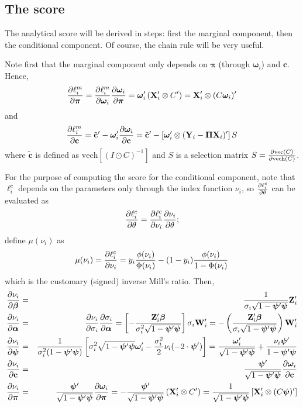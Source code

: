\documentclass[a4paper,10pt]{article}
\newcommand{\pder}[2]{\ensuremath\frac{\partial #1}{\partial #2}}
\newcommand{\Depvar}{y_{i}}
\newcommand{\Endog}{\mathbf{Y}_{i}}
\newcommand{\Expla}{\mathbf{Z}_{i}}
\newcommand{\ExoInst}{\mathbf{X}_{i}}
\newcommand{\CSReg}{\mathbf{W}_{i}}
\newcommand{\ScRfDist}{\bm{\omega}_i}
\newcommand{\ProbitPar}{\bm{\beta}}
\newcommand{\RfPar}{\bm{\Pi}}
\newcommand{\vRfPar}{\bm{\pi}}
\newcommand{\VarPar}{\bm{\alpha}}
\newcommand{\CondSig}{\sigma_i}
\newcommand{\ScCov}{\bm{\psi}}
\newcommand{\vechC}{\mathbf{c}}
\begin{document}
\subsection{The score}
\label{sec:score}

The analytical score will be derived in steps: first the marginal
component, then the conditional component. Of course, the chain rule will
be very useful.

Note first that the marginal component only depends on $\vRfPar$
(through $\ScRfDist$) and $\vechC$. Hence,
\[
\pder{\ell^m_i}{\vRfPar} = \pder{\ell^m_i}{\ScRfDist}
\pder{\ScRfDist}{\vRfPar} = \ScRfDist' \left( \ExoInst' \otimes C'
\right) =  \ExoInst' \otimes (C \ScRfDist)'
\]
and
\[
\pder{\ell^m_i}{\vechC} = \tilde{\mathbf{c}}' -
\ScRfDist'\pder{\ScRfDist}{\vechC} = \tilde{\mathbf{c}}' -
\left[\ScRfDist' \otimes (\Endog - \RfPar \ExoInst)' \right] S
\]
where $\tilde{\mathbf{c}}$ is defined as $\mathrm{vech}\left[ (I \odot
C)^{-1} \right]$ and $S$ is a selection matrix $S = \pder{\mathrm{vec}(C)}{\mathrm{vech}(C)}$.

For the purpose of computing the score for the conditional component,
note that $\ell^c_i$ depends on the parameters only through the index
function $\nu_i$, so $\pder{\ell^c_i}{\theta}$ can be evaluated as
\[
\pder{\ell^c_i}{\theta} = \pder{\ell^c_i}{\nu_i}\pder{\nu_i}{\theta} ;
\]
define $\mu(\nu_i)$ as
\[
\mu(\nu_i) = \pder{\ell^c_i}{\nu_i} = \Depvar
\frac{\phi(\nu_i)}{\Phi(\nu_i)} - (1-\Depvar)\frac{\phi(\nu_i)}{1
  -\Phi(\nu_i)}
\]
which is the customary (signed) inverse Mill's ratio. Then,
\begin{eqnarray*}
  \pder{\nu_i}{\ProbitPar} & = & \frac{1}{\CondSig \sqrt{1- \ScCov'
      \ScCov}} \Expla' \\
  \pder{\nu_i}{\VarPar} & = & \pder{\nu_i}{\CondSig}
  \pder{\CondSig}{\VarPar} =
  \left[- \frac{\Expla'\ProbitPar}
    {\CondSig^2 \sqrt{1- \ScCov' \ScCov}} \right] \CondSig \CSReg' =
  - \left( \frac{\Expla'\ProbitPar}
    {\CondSig \sqrt{1- \ScCov' \ScCov}}\right)  \CSReg' \\
  \pder{\nu_i}{\ScCov} & = &
  \frac{1}{\CondSig^2 (1- \ScCov' \ScCov)}
  \left[ 
    \CondSig^2 \sqrt{1- \ScCov' \ScCov} \ScRfDist' - 
    \frac{\CondSig^2}{2} \nu_i (-2 \cdot \ScCov')
  \right] =
  \frac{ \ScRfDist'}{\sqrt{1- \ScCov' \ScCov}} +
  \frac{\nu_i \ScCov'}{1- \ScCov' \ScCov} \\
  \pder{\nu_i}{\vechC} & = & \frac{\ScCov'}{\sqrt{1- \ScCov'
      \ScCov}} \pder{\ScRfDist}{\vechC} \\
  \pder{\nu_i}{\vRfPar} & = &\frac{\ScCov'}{\sqrt{1- \ScCov'
      \ScCov}} \pder{\ScRfDist}{\vRfPar} = 
      - \frac{\ScCov'}{\sqrt{1- \ScCov' \ScCov}} \left( \ExoInst'
        \otimes C' \right) = 
      \frac{1}{\sqrt{1- \ScCov'\ScCov}} \left[ \ExoInst' \otimes (C\ScCov)' \right]
\end{eqnarray*}
\end{document}
